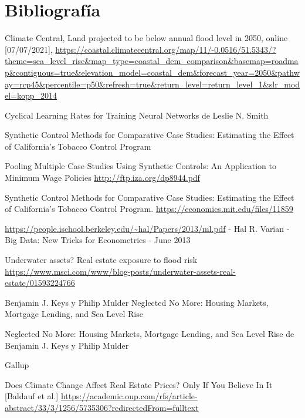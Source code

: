 \documentclass[12pt]{article}
\begin{document}
\section{Bibliografía}
\label{sec:bib}

\item Climate Central, Land projected to be below annual flood level in 2050, online [07/07/2021], \url{https://coastal.climatecentral.org/map/11/-0.0516/51.5343/?theme=sea_level_rise&map_type=coastal_dem_comparison&basemap=roadmap&contiguous=true&elevation_model=coastal_dem&forecast_year=2050&pathway=rcp45&percentile=p50&refresh=true&return_level=return_level_1&slr_model=kopp_2014}

\item Cyclical Learning Rates for Training Neural Networks de Leslie N. Smith

\item Synthetic Control Methods for Comparative Case Studies: Estimating the Effect of California’s Tobacco Control Program

\item Pooling Multiple Case Studies Using Synthetic Controls: An Application to Minimum Wage Policies \url{http://ftp.iza.org/dp8944.pdf}

\item Synthetic Control Methods for Comparative Case Studies: Estimating the Effect of California’s Tobacco Control Program. \url{https://economics.mit.edu/files/11859}

\item \url{https://people.ischool.berkeley.edu/~hal/Papers/2013/ml.pdf} - Hal R. Varian - Big Data: New Tricks for Econometrics - June 2013

\item Underwater assets? Real estate exposure to flood risk \url{https://www.msci.com/www/blog-posts/underwater-assets-real-estate/01593224766}

\item Benjamin J. Keys y Philip Mulder Neglected No More: Housing Markets, Mortgage Lending, and Sea Level Rise

\item Neglected No More: Housing Markets, Mortgage Lending, and Sea Level Rise de Benjamin J. Keys y Philip Mulder

\item Gallup 

\item Does Climate Change Affect Real Estate Prices? Only If You Believe In It [Baldauf et al.] \url{https://academic.oup.com/rfs/article-abstract/33/3/1256/5735306?redirectedFrom=fulltext}
\end{document}
